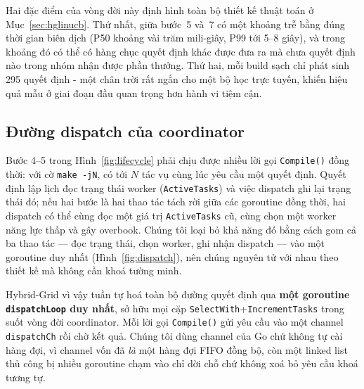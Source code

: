 \documentclass[final,5p,times,twocolumn]{elsarticle}
\begin{document}
Hai đặc điểm của vòng đời này định hình toàn bộ thiết kế thuật toán ở Mục~\ref{sec:hglinucb}. Thứ nhất, giữa bước~5 và~7 có một khoảng trễ bằng đúng thời gian biên dịch (P50 khoảng vài trăm mili-giây, P99 tới 5--8 giây), và trong khoảng đó có thể có hàng chục quyết định khác được đưa ra mà chưa quyết định nào trong nhóm nhận được phần thưởng. Thứ hai, mỗi build sạch chỉ phát sinh 295 quyết định - một chân trời rất ngắn cho một bộ học trực tuyến, khiến hiệu quả mẫu ở giai đoạn đầu quan trọng hơn hành vi tiệm cận.

\subsection{Đường dispatch của coordinator}
\label{sec:dispatch}

Bước 4--5 trong Hình~\ref{fig:lifecycle} phải chịu được nhiều lời gọi \texttt{Compile()} đồng thời: với cờ \texttt{make -jN}, có tới $N$ tác vụ cùng lúc yêu cầu một quyết định. Quyết định lập lịch đọc trạng thái worker (\texttt{ActiveTasks}) và việc dispatch ghi lại trạng thái đó; nếu hai bước là hai thao tác tách rời giữa các goroutine đồng thời, hai dispatch có thể cùng đọc một giá trị \texttt{ActiveTasks} cũ, cùng chọn một worker năng lực thấp và gây overbook. Chúng tôi loại bỏ khả năng đó bằng cách gom cả ba thao tác --- đọc trạng thái, chọn worker, ghi nhận dispatch --- vào một goroutine duy nhất (Hình~\ref{fig:dispatch}), nên chúng nguyên tử với nhau theo thiết kế mà không cần khoá tường minh.

Hybrid-Grid vì vậy tuần tự hoá toàn bộ đường quyết định qua \textbf{một goroutine \texttt{dispatchLoop} duy nhất}, sở hữu mọi cặp \texttt{SelectWith}+\texttt{IncrementTasks} trong suốt vòng đời coordinator. Mỗi lời gọi \texttt{Compile()} gửi yêu cầu vào một channel \texttt{dispatchCh} rồi chờ kết quả. Chúng tôi dùng channel của Go chứ không tự cài hàng đợi, vì channel vốn đã \emph{là} một hàng đợi FIFO đồng bộ, còn một linked list thủ công bị nhiều goroutine chạm vào chỉ dời chỗ chứ không xoá bỏ yêu cầu khoá tương tự.
\end{document}
